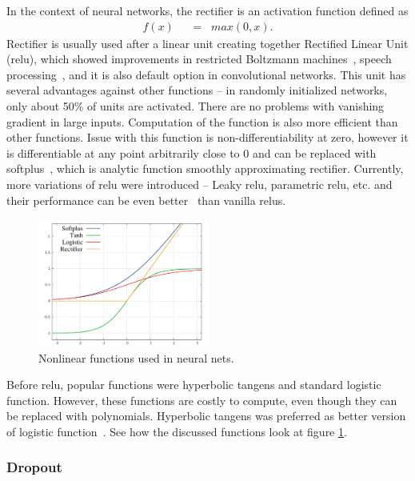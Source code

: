 In the context of neural networks, the rectifier is an activation function defined as
\begin{align}
f(x) \hspace{7pt}&=\hspace{7pt} max(0,x). \label{eq:rectifier}
\end{align}
Rectifier is usually used after a linear unit creating together Rectified Linear Unit (\gls{relu}), which showed improvements in restricted Boltzmann machines~\cite{DBLP:conf/icml/NairH10}, speech processing~\cite{zeiler2013rectified}, and it is also default option in convolutional networks. This unit has several advantages against other functions -- in randomly initialized networks, only about 50\% of units are activated. There are no problems with vanishing gradient in large inputs. Computation of the function is also more efficient than other functions. Issue with this function is non-differentiability at zero, however it is differentiable at any point arbitrarily close to 0 and can be replaced with softplus~\cite{dugas2001incorporating}, which is analytic function smoothly approximating rectifier. Currently, more variations of \gls{relu} were introduced -- Leaky \gls{relu}, parametric \gls{relu}, etc. and their performance can be even better~\cite{DBLP:journals/corr/XuWCL15} than vanilla \gls{relu}s.

\begin{figure}[!t]
	\centering
	\includegraphics[width=0.5\textwidth]{fig/nonlinearities.pdf}
	\caption{Nonlinear functions used in neural nets.
		\label{fig:nonlinear}}
\end{figure}
Before \gls{relu}, popular functions were hyperbolic tangens and standard logistic function. However, these functions are costly to compute, even though they can be replaced with polynomials. Hyperbolic tangens was preferred as better version of logistic function~\cite{lecun2012efficient}. See how the discussed functions look at figure \ref{fig:nonlinear}.

\subsubsection{Dropout}

